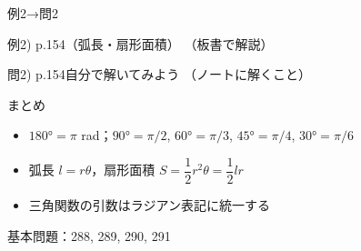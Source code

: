 \documentclass[aspectratio=43,professionalfonts,handout]{beamer}
\begin{document}
\begin{frame}{例2→問2}
  \begin{exampleblock}{例2) p.154（弧長・扇形面積）}
    （板書で解説）
  \end{exampleblock}

  \vfill

  \begin{block}{問2) p.154\quad 自分で解いてみよう}
    （ノートに解くこと）
  \end{block}
\end{frame}

\begin{frame}{まとめ}
  \begin{itemize}
    \item $180° = \pi$ rad；$90° = \pi/2$, $60° = \pi/3$, $45° = \pi/4$, $30° = \pi/6$
    \item 弧長 $l = r\theta$，扇形面積 $S = \dfrac{1}{2}r^2\theta = \dfrac{1}{2}lr$
    \item 三角関数の引数はラジアン表記に統一する
  \end{itemize}

  \vfill
  {\small 基本問題：288, 289, 290, 291}
\end{frame}
\end{document}
